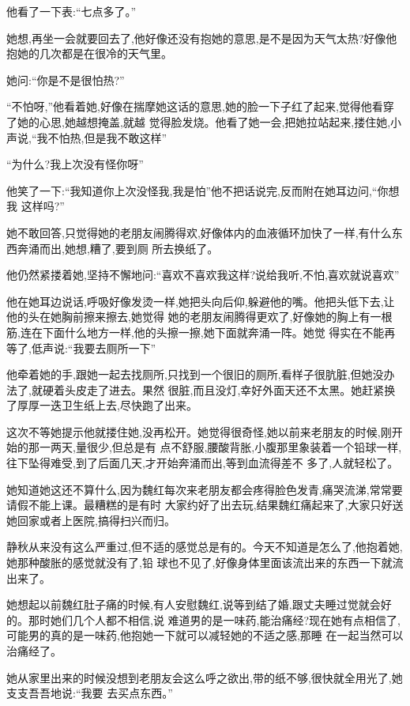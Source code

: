 ﻿\documentclass[12pt]{article}
\begin{document}
他看了一下表:``七点多了。''

她想,再坐一会就要回去了,他好像还没有抱她的意思,是不是因为天气太热?好像他抱她的几次都是在很冷的天气里。

她问:``你\myrule 是不是很\myrule 怕热?''

``不怕呀,''他看着她,好像在揣摩她这话的意思,她的脸一下子红了起来,觉得他看穿了她的心思,她越想掩盖,就越
觉得脸发烧。他看了她一会,把她拉站起来,搂住她,小声说,``我不怕热,但是我\myrule 不敢这样\myrule ''

``为什么?我\myrule 上次没有怪你呀\myrule ''

他笑了一下:``我知道你上次没怪我,我是怕\myrule ''他不把话说完,反而附在她耳边问,``你\myrule 想我
\myrule 这样吗?''

她不敢回答,只觉得她的老朋友闹腾得欢,好像体内的血液循环加快了一样,有什么东西奔涌而出,她想,糟了,要到厕
所去换纸了。

他仍然紧搂着她,坚持不懈地问:``喜欢不喜欢我\myrule 这样?说给我听,不怕,喜欢就说喜欢\myrule ''

他在她耳边说话,呼吸好像发烫一样,她把头向后仰,躲避他的嘴。他把头低下去,让他的头在她胸前擦来擦去,她觉得
她的老朋友闹腾得更欢了,好像她的胸上有一根筋,连在下面什么地方一样,他的头擦一擦,她下面就奔涌一阵。她觉
得实在不能再等了,低声说:``我\myrule 要去厕所一下\myrule ''

他牵着她的手,跟她一起去找厕所,只找到一个很旧的厕所,看样子很肮脏,但她没办法了,就硬着头皮走了进去。果然
很脏,而且没灯,幸好外面天还不太黑。她赶紧换了厚厚一迭卫生纸上去,尽快跑了出来。

这次不等她提示他就搂住她,没再松开。她觉得很奇怪,她以前来老朋友的时候,刚开始的那一两天,量很少,但总是有
点不舒服,腰酸背胀,小腹那里象装着一个铅球一样,往下坠得难受,到了后面几天,才开始奔涌而出,等到血流得差不
多了,人就轻松了。

她知道她这还不算什么,因为魏红每次来老朋友都会疼得脸色发青,痛哭流涕,常常要请假不能上课。最糟糕的是有时
大家约好了出去玩,结果魏红痛起来了,大家只好送她回家或者上医院,搞得扫兴而归。

静秋从来没有这么严重过,但不适的感觉总是有的。今天不知道是怎么了,他抱着她,她那种酸胀的感觉就没有了,铅
球也不见了,好像身体里面该流出来的东西一下就流出来了。

她想起以前魏红肚子痛的时候,有人安慰魏红,说等到结了婚,跟丈夫睡过觉就会好的。那时她们几个人都不相信,说
难道男的是一味药,能治痛经?现在她有点相信了,可能男的真的是一味药,他抱她一下就可以减轻她的不适之感,那睡
在一起当然可以治痛经了。

她从家里出来的时候没想到老朋友会这么呼之欲出,带的纸不够,很快就全用光了,她支支吾吾地说:``我\myrule 要
去买点东西。''
\end{document}
